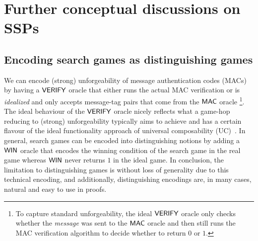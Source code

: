 \section{Further conceptual discussions on SSPs}

\subsection{Encoding search games as distinguishing games}\label{app:dist}
We can encode (strong) unforgeability of message authentication
codes (MACs) by having a $\mathsf{VERIFY}$ oracle that either
runs the actual MAC verification or is \emph{idealized} and only accepts
message-tag pairs that come from the $\mathsf{MAC}$ oracle
\footnote{To capture standard unforgeability, the ideal $\mathsf{VERIFY}$ oracle 
only checks whether the \emph{message} was sent to the $\mathsf{MAC}$ oracle
and then still runs the MAC verification algorithm to decide whether to
return $0$ or $1$.}. The ideal behaviour of the $\mathsf{VERIFY}$ oracle nicely 
reflects what a game-hop reducing to (strong) unforgeability typically
aims to achieve and has a certain flavour of the ideal functionality approach
of universal composability (UC)~\cite{FOCS:Canetti01}. In general, search games can be
encoded into distinguishing notions by adding a $\mathsf{WIN}$ oracle that encodes the winning condition of the search game in the real game whereas $\mathsf{WIN}$ never
returns $1$ in the ideal game. In conclusion, the limitation to
distinguishing games is without loss of generality due to this technical
encoding, and additionally, distinguishing encodings are, in many cases,
natural and easy to use in proofs.

